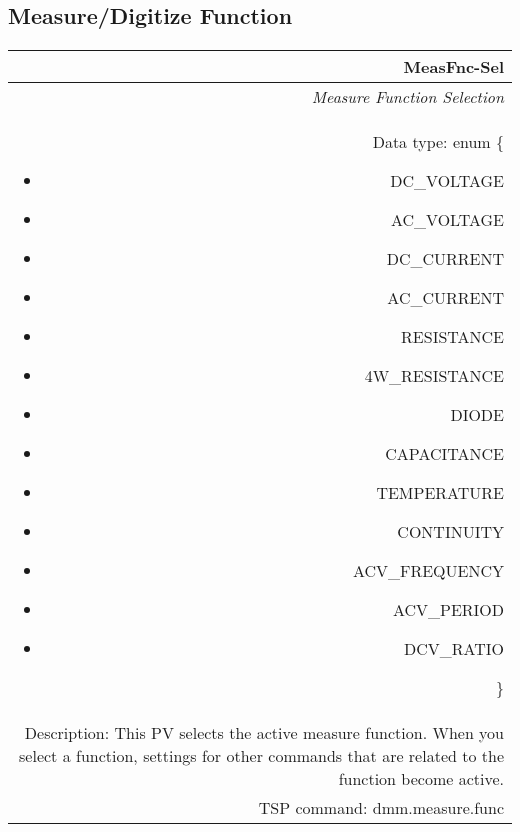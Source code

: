 \documentclass[openany]{article}
\begin{document}
	\subsection{Measure/Digitize Function}\label{pvgroup:function}

		\paragraph{} %

		\begin{tabular}{N}
			\hline
			\bfseries MeasFnc-Sel \\ \hline
			\emph{Measure Function Selection} \\
			Data type: enum \{\begin{itemize}[noitemsep]
				\small
				\item[] DC\_VOLTAGE
				\item[] AC\_VOLTAGE
				\item[] DC\_CURRENT
				\item[] AC\_CURRENT
				\item[] RESISTANCE
				\item[] 4W\_RESISTANCE
				\item[] DIODE
				\item[] CAPACITANCE
				\item[] TEMPERATURE
				\item[] CONTINUITY
				\item[] ACV\_FREQUENCY
				\item[] ACV\_PERIOD
				\item[] DCV\_RATIO
			\end{itemize}\} \\
			Description: This PV selects the active measure function. When you select a function, settings for other commands that are related to the function become active. \\
			TSP command: dmm.measure.func
		\end{tabular}
\end{document}
